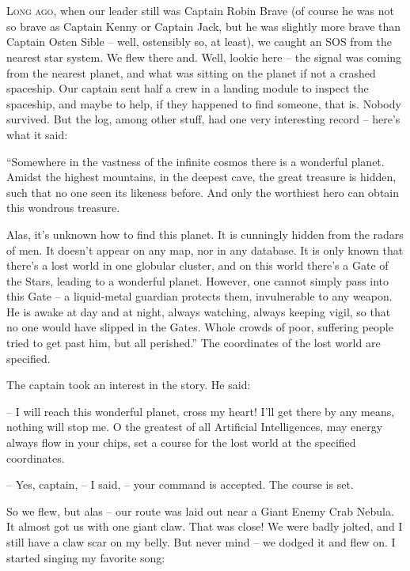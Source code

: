 \documentclass[ebook,twoside,final,openright]{memoir}
\begin{document}
\chapter{}
\par
\lettrine{L}{ong ago,} when our leader still was Captain Robin Brave (of course he was not so brave as Captain Kenny or Captain Jack, but he was slightly more brave than Captain Osten Sible – well, ostensibly so, at least), we caught an SOS from the nearest star system. We flew there and. Well, lookie here – the signal was coming from the nearest planet, and what was sitting on the planet if not a crashed spaceship. Our captain sent half a crew in a landing module to inspect the spaceship, and maybe to help, if they happened to find someone, that is. Nobody survived. But the log, among other stuff, had one very interesting record – here’s what it said:\par
\par
“Somewhere in the vastness of the infinite cosmos there is a wonderful planet. Amidst the highest mountains, in the deepest cave, the great treasure is hidden, such that no one seen its likeness before. And only the worthiest hero can obtain this wondrous treasure. \par
Alas, it’s unknown how to find this planet. It is cunningly hidden from the radars of men. It doesn’t appear on any map, nor in any database. It is only known that there’s a lost world in one globular cluster, and on this world there’s a Gate of the Stars, leading to a wonderful planet. However, one cannot simply pass into this Gate – a liquid-metal guardian protects them, invulnerable to any weapon. He is awake at day and at night, always watching, always keeping vigil, so that no one would have slipped in the Gates. Whole crowds of poor, suffering people tried to get past him, but all perished.” The coordinates of the lost world are specified.\par
\par
The captain took an interest in the story. He said:\par
– I will reach this wonderful planet, cross my heart! I'll get there by any means, nothing will stop me. O the greatest of all Artificial Intelligences, may energy always flow in your chips, set a course for the lost world at the specified coordinates.\par
– Yes, captain, – I said, – your command is accepted. The course is set.\par
So we flew, but alas – our route was laid out near a Giant Enemy Crab Nebula. It almost got us with one giant claw. That was close! We were badly jolted, and I still have a claw scar on my belly. But never mind – we dodged it and flew on. I started singing my favorite song: \par
\end{document}
